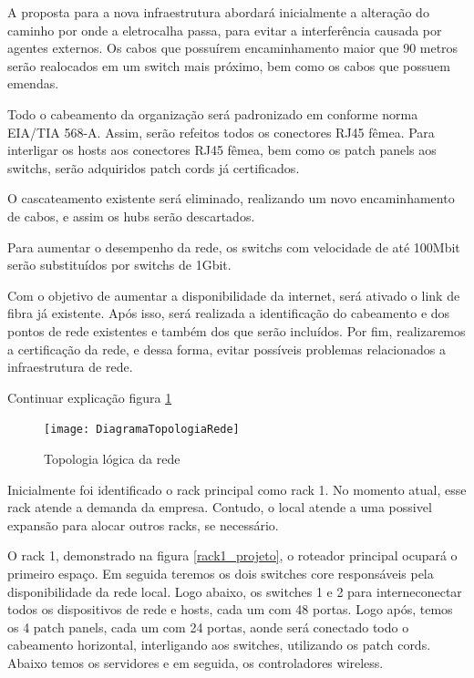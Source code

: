 \documentclass[	DIV=calc,%
							paper=a4,%
							fontsize=12pt,%
							onecolumn]{scrartcl}	 					%
\begin{document}
A proposta para a nova infraestrutura abordará inicialmente a alteração do caminho por onde a eletrocalha passa, para evitar a interferência causada por agentes externos. Os cabos que possuírem encaminhamento maior que 90 metros serão realocados em um switch mais próximo, bem como os cabos que possuem emendas.

Todo o cabeamento da organização será padronizado em conforme norma EIA/TIA 568-A. Assim, serão refeitos todos os conectores RJ45 fêmea. Para interligar os hosts aos conectores RJ45 fêmea, bem como os patch panels aos switchs, serão adquiridos patch cords já certificados.

O cascateamento existente será eliminado, realizando um novo encaminhamento de cabos, e assim os hubs serão descartados.

Para aumentar o desempenho da rede, os switchs com velocidade de até 100Mbit serão substituídos por switchs de 1Gbit. 

Com o objetivo de aumentar a disponibilidade da internet, será ativado o link de fibra já existente. Após isso, será realizada a identificação do cabeamento e dos pontos de rede existentes e também dos que serão incluídos. Por fim, realizaremos a certificação da rede, e dessa forma, evitar possíveis problemas relacionados a infraestrutura de rede.

Continuar explicação figura \ref{DiagramaTopologiaRede}



\begin{figure}[h!]
	\centering
	\texttt{[image: DiagramaTopologiaRede]}
	\caption{Topologia lógica da rede}
	\label{DiagramaTopologiaRede}
\end{figure}

	Inicialmente foi identificado o rack principal como rack 1. No momento atual, esse rack atende a demanda da empresa. Contudo, o local atende a uma possivel expansão para alocar outros racks, se necessário.

	O rack 1, demonstrado na figura \ref{rack1_projeto}, o roteador principal ocupará o primeiro espaço. Em seguida teremos os dois switches core responsáveis pela disponibilidade da rede local. Logo abaixo, os switches 1 e 2 para interneconectar todos os dispositivos de rede e hosts, cada um com 48 portas.
	Logo após, temos os 4 patch panels, cada um com 24 portas, aonde será conectado todo o cabeamento horizontal, interligando aos switches, utilizando os patch cords. Abaixo temos os servidores e em seguida, os controladores wireless. 
\end{document}
